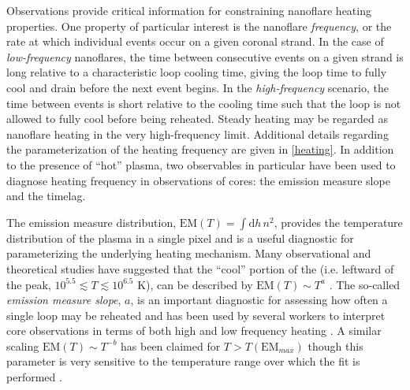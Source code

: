 Observations provide critical information for constraining nanoflare heating properties. One property of particular interest is the nanoflare \textit{frequency}, or the rate at which individual events occur on a given coronal strand. In the case of \textit{low-frequency} nanoflares, the time between consecutive events on a given strand is long relative to a characteristic loop cooling time, giving the loop time to fully cool and drain before the next event begins. In the \textit{high-frequency} scenario, the time between events is short relative to the cooling time such that the loop is not allowed to fully cool before being reheated. Steady heating may be regarded as nanoflare heating in the very high-frequency limit. Additional details regarding the parameterization of the heating frequency are given in \autoref{heating}. In addition to the presence of ``hot'' plasma, two observables in particular have been used to diagnose heating frequency in observations of \AR{} cores: the emission measure slope and the timelag. 

The emission measure distribution, $\mathrm{EM}(T)=\int\mathrm{d}h\,n^2$, provides the temperature distribution of the plasma in a single pixel and is a useful diagnostic for parameterizing the underlying heating mechanism. Many observational and theoretical studies have suggested that the ``cool'' portion of the \dem{} (i.e. leftward of the peak, $10^{5.5}\lesssim T\lesssim10^{6.5}$ K), can be described by $\mathrm{EM}(T)\sim T^a$ \citep{jordan_structure_1976,cargill_implications_1994,cargill_nanoflare_2004,warren_systematic_2012}. The so-called \textit{emission measure slope}, $a$, is an important diagnostic for assessing how often a single loop may be reheated and has been used by several workers to interpret \AR{} core observations in terms of both high and low frequency heating \citet[see Table 3 of][and references therin]{bradshaw_diagnosing_2012}. A similar scaling $\mathrm{EM}(T)\sim T^{-b}$ has been claimed for $T>T(\mathrm{EM}_{max})$ though this parameter is very sensitive to the temperature range over which the fit is performed \citep[see section 3.3.1 of][]{barnes_inference_2016-1}.

